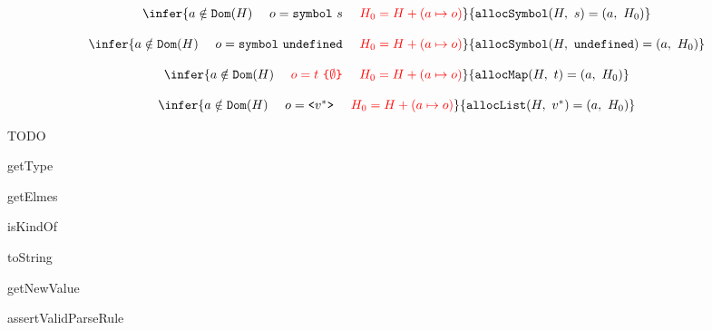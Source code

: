 \documentclass[11pt]{article}
\newcommand{\Term}[1]{\texttt{#1}}
\newcommand{\inred}[1]{{\color{red}{#1}}}
\newcommand{\symheap}[0]{H}
\newcommand{\hallocsym}[4]{\Term{allocSymbol}(#1,\ #2) = (#3,\ #4)}
\newcommand{\halloclist}[4]{\Term{allocList}(#1,\ #2) = (#3,\ #4)}
\newcommand{\hallocmap}[4]{\Term{allocMap}(#1,\ #2) = (#3,\ #4)}
\begin{document}
\[\begin{array}{c}
\\ \\
\infer
{a \notin \Term{Dom}(\symheap)\ \ \ \
o = \Term{symbol}\ s\ \ \ \
\inred{\symheap_0 = \symheap + (a \mapsto o)}}
{\hallocsym{\symheap}{s}{a}{\symheap_0}}
\\ \\
\infer
{a \notin \Term{Dom}(\symheap)\ \ \ \
o = \Term{symbol}\ \Term{undefined}\ \ \ \
\inred{\symheap_0 = \symheap + (a \mapsto o)}}
{\hallocsym{\symheap}{\Term{undefined}}{a}{\symheap_0}}
\\ \\
\infer
{a \notin \Term{Dom}(\symheap)\ \ \ \
\inred{o = t\ \Term{\{} {\emptyset} \Term{\}}}\ \ \ \
\inred{\symheap_0 = \symheap + (a \mapsto o)}}
{\hallocmap{\symheap}{t}{a}{\symheap_0}}
\\ \\
\infer
{a \notin \Term{Dom}(\symheap)\ \ \ \
o = \Term{<} v^* \Term{>}\ \ \ \
\inred{\symheap_0 = \symheap + (a \mapsto o)}}
{\halloclist{\symheap}{v^*}{a}{\symheap_0}}
\end{array}\]

TODO

getType

getElmes

isKindOf

toString

getNewValue

assertValidParseRule
\end{document}
